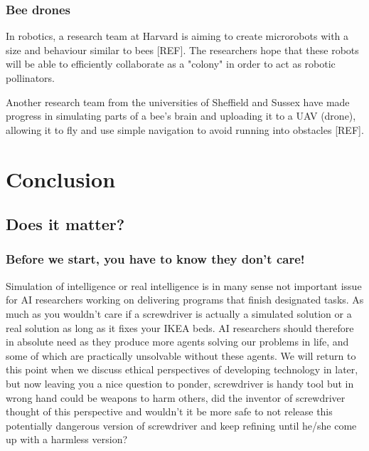 \documentclass[11pt]{article}
\begin{document}
\subsubsection*{Bee drones}

In robotics, a research team at Harvard is aiming to create microrobots with a size and behaviour similar to bees [REF]. The researchers hope that these robots will be able to efficiently collaborate as a "colony" in order to act as robotic pollinators.

Another research team from the universities of Sheffield and Sussex have made progress in simulating parts of a bee's brain and uploading it to a UAV (drone), allowing it to fly and use simple navigation to avoid running into obstacles [REF].



\section{Conclusion}
\label{sec:conclusion}

\subsection{Does it matter?}

\subsubsection*{Before we start, you have to know they don't care!}

Simulation of intelligence or real intelligence is in many sense not important issue for AI researchers working on delivering programs that finish designated tasks. As much as you wouldn't care if a screwdriver is actually a simulated solution or a real solution as long as it fixes your IKEA beds. AI researchers should therefore in absolute need as they produce more agents solving our problems in life, and some of which are practically unsolvable without these agents. We will return to this point when we discuss ethical perspectives of developing technology in later, but now leaving you a nice question to ponder, screwdriver is handy tool but in wrong hand could be weapons to harm others, did the inventor of screwdriver thought of this perspective and wouldn’t it be more safe to not release this potentially dangerous version of screwdriver and keep refining until he/she come up with a harmless version?
  
\end{document}
